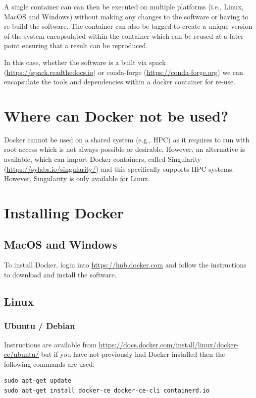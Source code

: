 \documentclass[authoryear, 11pt, oneside]{report}
\begin{document}
A single container can can then be executed on multiple platforms (i.e., Linux, MacOS and Windows) without making any changes to the software or having to re-build the software. The container can also be tagged to create a unique version of the system encapsulated within the container which can be reused at a later point ensuring that a result can be reproduced.

In this case, whether the software is a built via spack (\url{https://spack.readthedocs.io}) or conda-forge (\url{https://conda-forge.org}) we can encapsulate the tools and dependencies within a docker container for re-use. 

\section{Where can Docker not be used?}

Docker cannot be used on a shared system (e.g., HPC) as it requires to run with root access which is not always possible or desirable. However, an alternative is available, which can import Docker containers, called Singularity (\url{https://sylabs.io/singularity/}) and this specifically supports HPC systems. However, Singularity is only available for Linux.

\section{Installing Docker}

\subsection{MacOS and Windows}

To install Docker, login into \url{https://hub.docker.com} and follow the instructions to download and install the software.

\subsection{Linux}

\subsubsection{Ubuntu / Debian}
 Instructions are available from \url{https://docs.docker.com/install/linux/docker-ce/ubuntu/} but if you have not previously had Docker installed then the following commands are used:
 
\begin{verbatim}
sudo apt-get update
sudo apt-get install docker-ce docker-ce-cli containerd.io
\end{verbatim}
\end{document}
